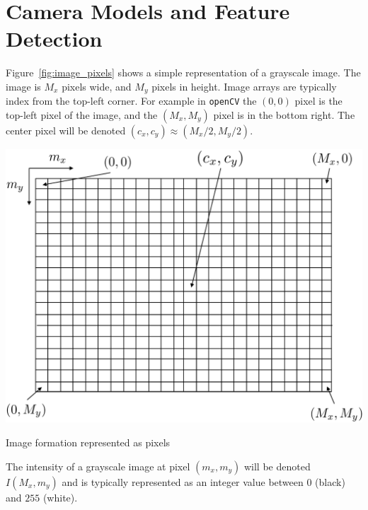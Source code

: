 
\chapter{Camera Models and Feature Detection}
\label{chap:camera_features}

Figure~\ref{fig:image_pixels} shows a simple representation of a grayscale image.  The image is $M_x$ pixels wide, and $M_y$ pixels in height.  Image arrays are typically index from the top-left corner.  For example in \texttt{openCV} the $(0,0)$ pixel is the top-left pixel of the image, and the $(M_x, M_y)$ pixel is in the bottom right.  The center pixel will be denoted $(c_x, c_y)\approx (M_x/2, M_y/2)$. 
\begin{marginfigure}
  \includegraphics[width=\linewidth]{chap6_camera_features/figures/image_pixels}
  \caption{Image formation represented as pixels}
  \label{fig:image_pixels}  
\end{marginfigure}
The intensity of a grayscale image at pixel $(m_x, m_y)$ will be denoted $I(M_x,m_y)$ and is typically represented as an integer value between $0$ (black) and $255$ (white).  


